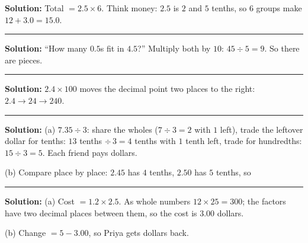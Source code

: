 \documentclass[12pt]{article}
\begin{document}

\textbf{Solution:} Total $= 2.5 \times 6$. Think money: $2.5$ is $2$ and $5$
tenths, so $6$ groups make $12 + 3.0 = 15.0$. 

\vspace{0.2cm}\noindent\rule{\linewidth}{0.2pt}\vspace{0.1cm}


\textbf{Solution:} ``How many $0.5$s fit in $4.5$?'' Multiply both by $10$:
$45 \div 5 = 9$. So there are  pieces.

\vspace{0.2cm}\noindent\rule{\linewidth}{0.2pt}\vspace{0.1cm}


\textbf{Solution:} $2.4 \times 100$ moves the decimal point two places to the
right: $2.4 \to 24 \to 240$. 

\vspace{0.2cm}\noindent\rule{\linewidth}{0.2pt}\vspace{0.1cm}


\textbf{Solution:}
(a) $7.35 \div 3$: share the wholes ($7 \div 3 = 2$ with $1$ left), trade the
leftover dollar for tenths: $13$ tenths $\div\, 3 = 4$ tenths with $1$ tenth
left, trade for hundredths: $15 \div 3 = 5$. Each friend pays 
dollars.

(b) Compare place by place: $2.45$ has $4$ tenths, $2.50$ has $5$ tenths, so

\vspace{0.2cm}\noindent\rule{\linewidth}{0.2pt}\vspace{0.1cm}


\textbf{Solution:}
(a) Cost $= 1.2 \times 2.5$. As whole numbers $12 \times 25 = 300$; the
factors have two decimal places between them, so the cost is $3.00$ dollars.

(b) Change $= 5 - 3.00$, so Priya gets  dollars back.
\end{document}

